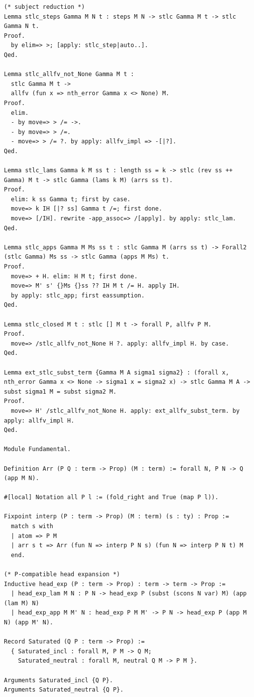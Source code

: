 \documentclass[10pt,a4paper]{amsart}
\begin{document}
\begin{lstlisting}
(* subject reduction *)
Lemma stlc_steps Gamma M N t : steps M N -> stlc Gamma M t -> stlc Gamma N t.
Proof.
  by elim=> >; [apply: stlc_step|auto..].
Qed.

Lemma stlc_allfv_not_None Gamma M t :
  stlc Gamma M t ->
  allfv (fun x => nth_error Gamma x <> None) M.
Proof.
  elim.
  - by move=> > /= ->.
  - by move=> > /=.
  - move=> > /= ?. by apply: allfv_impl => -[|?].
Qed.

Lemma stlc_lams Gamma k M ss t : length ss = k -> stlc (rev ss ++ Gamma) M t -> stlc Gamma (lams k M) (arrs ss t).
Proof.
  elim: k ss Gamma t; first by case.
  move=> k IH [|? ss] Gamma t /=; first done.
  move=> [/IH]. rewrite -app_assoc=> /[apply]. by apply: stlc_lam.
Qed.

Lemma stlc_apps Gamma M Ms ss t : stlc Gamma M (arrs ss t) -> Forall2 (stlc Gamma) Ms ss -> stlc Gamma (apps M Ms) t.
Proof.
  move=> + H. elim: H M t; first done.
  move=> M' s' {}Ms {}ss ?? IH M t /= H. apply IH.
  by apply: stlc_app; first eassumption.
Qed.

Lemma stlc_closed M t : stlc [] M t -> forall P, allfv P M.
Proof.
  move=> /stlc_allfv_not_None H ?. apply: allfv_impl H. by case.
Qed.

Lemma ext_stlc_subst_term {Gamma M A sigma1 sigma2} : (forall x, nth_error Gamma x <> None -> sigma1 x = sigma2 x) -> stlc Gamma M A -> subst sigma1 M = subst sigma2 M.
Proof.
  move=> H' /stlc_allfv_not_None H. apply: ext_allfv_subst_term. by apply: allfv_impl H.
Qed.

Module Fundamental.

Definition Arr (P Q : term -> Prop) (M : term) := forall N, P N -> Q (app M N).

#[local] Notation all P l := (fold_right and True (map P l)).

Fixpoint interp (P : term -> Prop) (M : term) (s : ty) : Prop :=
  match s with
  | atom => P M
  | arr s t => Arr (fun N => interp P N s) (fun N => interp P N t) M
  end.

(* P-compatible head expansion *)
Inductive head_exp (P : term -> Prop) : term -> term -> Prop :=
  | head_exp_lam M N : P N -> head_exp P (subst (scons N var) M) (app (lam M) N)
  | head_exp_app M M' N : head_exp P M M' -> P N -> head_exp P (app M N) (app M' N).

Record Saturated (Q P : term -> Prop) :=
  { Saturated_incl : forall M, P M -> Q M;
    Saturated_neutral : forall M, neutral Q M -> P M }.

Arguments Saturated_incl {Q P}.
Arguments Saturated_neutral {Q P}.


\end{lstlisting}
\end{document}
